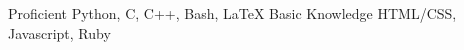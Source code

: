 \begin{cvskills}
\cvskill
  {Proficient}
  {Python, C, C++, Bash, \LaTeX}
\cvskill
  {Basic Knowledge}
  {HTML/CSS, Javascript, Ruby}
\end{cvskills}
